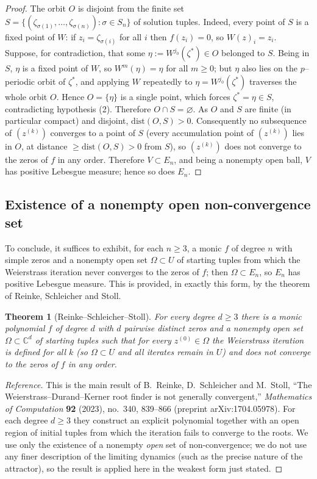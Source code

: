 \documentclass{amsart}
\newtheorem{theorem}{Theorem}
\theoremstyle{definition}
\theoremstyle{remark}
\newcommand{\C}{\mathbb{C}}
\begin{document}
\begin{proof}
The orbit $O$ is disjoint from the finite set
$S=\{(\zeta_{\sigma(1)},\dots,\zeta_{\sigma(n)}):\sigma\in S_n\}$ of solution tuples. Indeed,
every point of $S$ is a fixed point of $W$: if $z_i=\zeta_{\sigma(i)}$ for all $i$ then
$f(z_i)=0$, so $W(z)_i=z_i$. Suppose, for contradiction, that some
$\eta:=W^{j_0}(\zeta^{*})\in O$ belonged to $S$. Being in $S$, $\eta$ is a fixed point of
$W$, so $W^{m}(\eta)=\eta$ for all $m\ge0$; but $\eta$ also lies on the $p$--periodic orbit of
$\zeta^{*}$, and applying $W$ repeatedly to $\eta=W^{j_0}(\zeta^{*})$ traverses the whole
orbit $O$. Hence $O=\{\eta\}$ is a single point, which forces $\zeta^{*}=\eta\in S$,
contradicting hypothesis (2). Therefore $O\cap S=\varnothing$. As $O$ and $S$ are finite (in
particular compact) and disjoint, $\mathrm{dist}(O,S)>0$. Consequently no subsequence of
$(z^{(k)})$ converges to a point of $S$ (every accumulation point of $(z^{(k)})$ lies in $O$,
at distance $\ge\mathrm{dist}(O,S)>0$ from $S$), so $(z^{(k)})$ does not converge to the zeros
of $f$ in any order. Therefore $V\subset E_n$, and being a nonempty open ball, $V$ has
positive Lebesgue measure; hence so does $E_n$.
\end{proof}

\subsection{Existence of a nonempty open non-convergence set}

To conclude, it suffices to exhibit, for each $n\ge3$, a monic $f$ of degree $n$ with simple
zeros and a nonempty open set $\Omega\subset U$ of starting tuples from which the Weierstrass
iteration never converges to the zeros of $f$; then $\Omega\subset E_n$, so $E_n$ has positive
Lebesgue measure. This is provided, in exactly this form, by the theorem of Reinke, Schleicher
and Stoll.

\begin{theorem}[Reinke--Schleicher--Stoll]\label{thm:rss}
For every degree $d\ge3$ there is a monic polynomial $f$ of degree $d$ with $d$ pairwise
distinct zeros and a nonempty open set $\Omega\subset\C^{d}$ of starting tuples such that for
every $z^{(0)}\in\Omega$ the Weierstrass iteration is defined for all $k$ (so $\Omega\subset
U$ and all iterates remain in $U$) and does not converge to the zeros of $f$ in any order.
\end{theorem}

\begin{proof}[Reference]
This is the main result of B.~Reinke, D.~Schleicher and M.~Stoll, ``The
Weierstrass--Durand--Kerner root finder is not generally convergent,'' \emph{Mathematics of
Computation} \textbf{92} (2023), no.\ 340, 839--866 (preprint arXiv:1704.05978). For each
degree $d\ge3$ they construct an explicit polynomial together with an open region of initial
tuples from which the iteration fails to converge to the roots. We use only the existence of a
nonempty \emph{open} set of non-convergence; we do not use any finer description of the
limiting dynamics (such as the precise nature of the attractor), so the result is applied here
in the weakest form just stated.
\end{proof}
\end{document}
